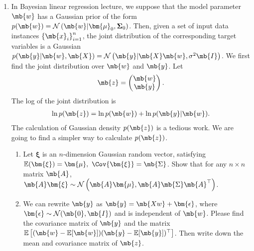\begin{exercise}
    \begin{enumerate}
        \item In Bayesian linear regression lecture, we suppose that the model parameter $\mb{w}$ has a Gaussian prior of the form
            $p(\mb{w})=\mathcal{N}\left(\mb{w}|\bm{\mu}_{0}, \boldsymbol{\Sigma}_{0}\right)$. Then, given a set of input data instances  $\left\{\mb{x}_{i}\right\}_{i=1}^{n}$, the joint distribution of the corresponding target variables is a Gaussian
            $p(\mb{y}|\mb{w}, \mb{X})=\mathcal{N}\left(\mb{y}|\mb{X} \mb{w}, \sigma^{2} \mb{I}\right)$. We first find the joint distribution over $\mb{w}$ and $\mb{y}$. Let
            \begin{align*}
                \mb{z}=\begin{pmatrix}
                           \mb{w} \\
                           \mb{y}
                       \end{pmatrix}.
            \end{align*}
            The log of the joint distribution is
            \begin{align*}
                \ln p(\mb{z})=\ln p(\mb{w})+\ln p(\mb{y}|\mb{w}).
            \end{align*}
            The calculation of Gaussian density $p(\mb{z})$ is a tedious work. We are going to find a simpler way to calculate $p(\mb{z})$.
            \begin{enumerate}
                \item Let $\bm{\xi}$ is an $n$-dimension Gaussian random vector, satisfying  $\mathbb{E}(\bm{\xi})=\bm{\mu},\ \Cov{\bm{\xi}}=\mb{\Sigma}$. Show that for any $n \times n$ matrix $\mb{A}$,
                    $\mb{A} \bm{\xi} \sim \mathcal{N}\left(\mb{A} \bm{\mu},\mb{A} \mb{\Sigma} \mb{A}^{\top}\right)$.
                \item We can rewrite $\mb{y}$ as $\mb{y}=\mb{Xw}+\bm{\epsilon}$, where $\bm{\epsilon}\sim\mathcal{N}(\mb{0},\mb{I})$ and is independent of $\mb{w}$. Please find the covariance matrix of $\mb{y}$ and the matrix $\mathbb{E}\left[(\mb{w}-\mathbb{E}[\mb{w}])(\mb{y}-\mathbb{E}[\mb{y}])^\top\right]$.
                    Then write down the mean and covariance matrix of $\mb{z}$.
            \end{enumerate}
            

\end{enumerate}
\end{exercise}
